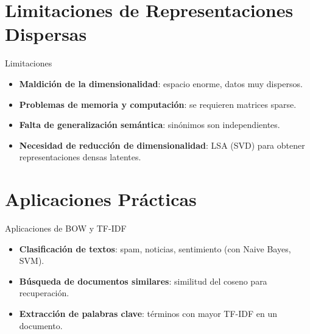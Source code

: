 \documentclass[aspectratio=169, 10pt, xcolor=table]{beamer}
\begin{document}
\section{Limitaciones de Representaciones Dispersas}

\begin{frame}{Limitaciones}
    \begin{itemize}
        \item \textbf{Maldición de la dimensionalidad}: espacio enorme, datos muy dispersos.
        \item \textbf{Problemas de memoria y computación}: se requieren matrices sparse.
        \item \textbf{Falta de generalización semántica}: sinónimos son independientes.
        \item \textbf{Necesidad de reducción de dimensionalidad}: LSA (SVD) para obtener representaciones densas latentes.
    \end{itemize}
\end{frame}

\section{Aplicaciones Prácticas}

\begin{frame}{Aplicaciones de BOW y TF-IDF}
    \begin{itemize}
        \item \textbf{Clasificación de textos}: spam, noticias, sentimiento (con Naive Bayes, SVM).
        \item \textbf{Búsqueda de documentos similares}: similitud del coseno para recuperación.
        \item \textbf{Extracción de palabras clave}: términos con mayor TF-IDF en un documento.
    \end{itemize}
\end{frame}

\end{document}
